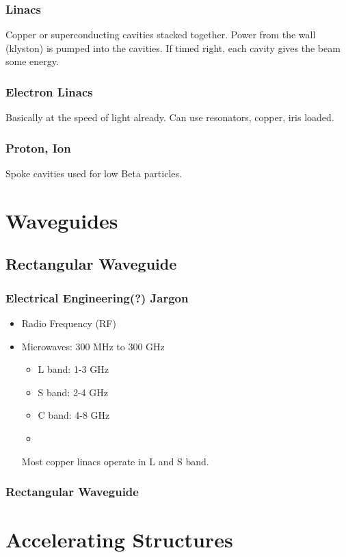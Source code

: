 \documentclass[professionalfonts,t]{beamer}
\begin{document}
\begin{frame}
\frametitle{Linacs}
Copper or superconducting cavities stacked together.
Power from the wall (klyston) is pumped into the cavities.
If timed right, each cavity gives the beam some energy.




\end{frame}

\begin{frame}[containsverbatim]
\frametitle{Electron Linacs}
Basically at the speed of light already.
Can use resonators, copper, iris loaded.
\end{frame}


\begin{frame}
\frametitle{Proton, Ion}
Spoke cavities used for low Beta particles.
\end{frame}



\section{Waveguides}
\subsection{Rectangular Waveguide}
\begin{frame}
\frametitle{Electrical Engineering(?) Jargon}
\begin{itemize}
	\item Radio Frequency (RF)
	\item Microwaves: 300 MHz to 300 GHz 
	\begin{itemize}
		\item L band: 1-3 GHz
		\item S band: 2-4 GHz
		\item C band: 4-8 GHz
		\item 
	\end{itemize}

Most copper linacs operate in L and S band. 
\end{itemize}
\end{frame}

\begin{frame}
\frametitle{Rectangular Waveguide}
\end{frame}
\section{Accelerating Structures}
\end{document}
